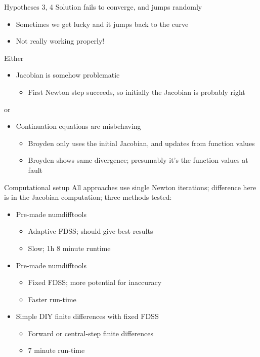 \documentclass[presentation]{beamer}
\begin{document}
\begin{frame}[label={sec:org89212d0}]{Hypotheses 3, 4}
Solution fails to converge, and jumps randomly
\begin{itemize}
\item Sometimes we get lucky and it jumps back to the curve
\item Not really working properly!
\end{itemize}
\vfill
Either
\begin{itemize}
\item Jacobian is somehow problematic
\begin{itemize}
\item First Newton step succeeds, so initially the Jacobian is probably right
\end{itemize}
\end{itemize}
or
\begin{itemize}
\item Continuation equations are misbehaving
\begin{itemize}
\item Broyden only uses the initial Jacobian, and updates from function values
\item Broyden shows same divergence; presumably it's the function values at fault
\end{itemize}
\end{itemize}
\vfill
\end{frame}


\begin{frame}[label={sec:org3b331bb}]{Computational setup}
All approaches use single Newton iterations; difference here is in the Jacobian computation; three methods tested:
\vfill
\begin{itemize}
\item Pre-made numdifftools
\begin{itemize}
\item Adaptive FDSS; should give best results
\item Slow; 1h 8 minute runtime
\end{itemize}
\item Pre-made numdifftools
\begin{itemize}
\item Fixed FDSS; more potential for inaccuracy
\item Faster run-time
\end{itemize}
\item Simple DIY finite differences with fixed FDSS
\begin{itemize}
\item Forward or central-step finite differences
\item 7 minute run-time
\end{itemize}
\end{itemize}
\end{frame}
\end{document}

